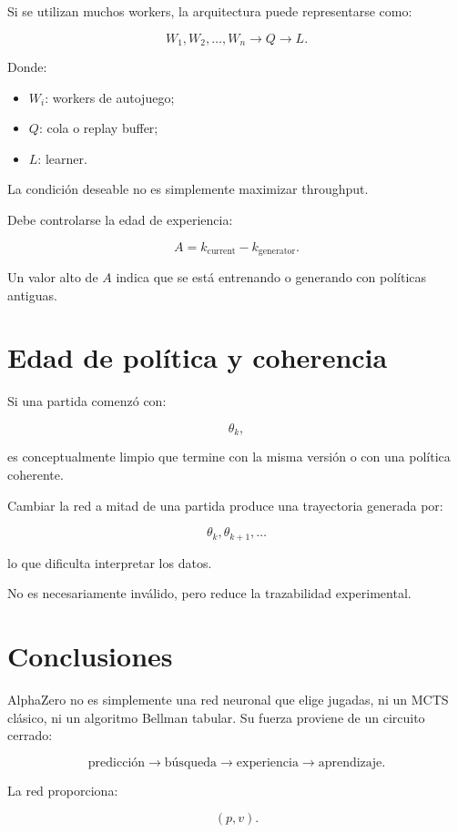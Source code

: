 \documentclass[11pt,a4paper]{article}
\begin{document}
Si se utilizan muchos workers, la arquitectura puede representarse como:

\[
W_1,W_2,\ldots,W_n
\rightarrow
Q
\rightarrow
L.
\]

Donde:

\begin{itemize}
    \item \(W_i\): workers de autojuego;
    \item \(Q\): cola o replay buffer;
    \item \(L\): learner.
\end{itemize}

La condición deseable no es simplemente maximizar throughput.

Debe controlarse la edad de experiencia:

\[
A
=
k_{\mathrm{current}}
-
k_{\mathrm{generator}}.
\]

Un valor alto de \(A\) indica que se está entrenando o generando con políticas antiguas.

\section{Edad de política y coherencia}

Si una partida comenzó con:

\[
\theta_k,
\]

es conceptualmente limpio que termine con la misma versión o con una política coherente.

Cambiar la red a mitad de una partida produce una trayectoria generada por:

\[
\theta_k,\theta_{k+1},\ldots
\]

lo que dificulta interpretar los datos.

No es necesariamente inválido, pero reduce la trazabilidad experimental.

\section{Conclusiones}

AlphaZero no es simplemente una red neuronal que elige jugadas, ni un MCTS clásico, ni un algoritmo Bellman tabular. Su fuerza proviene de un circuito cerrado:

\[
\text{predicción}
\rightarrow
\text{búsqueda}
\rightarrow
\text{experiencia}
\rightarrow
\text{aprendizaje}.
\]

La red proporciona:

\[
(p,v).
\]
\end{document}
